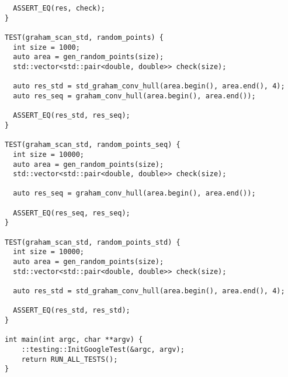\documentclass{report}
\begin{document}
\begin{lstlisting}
  ASSERT_EQ(res, check);
}

TEST(graham_scan_std, random_points) {
  int size = 1000;
  auto area = gen_random_points(size);
  std::vector<std::pair<double, double>> check(size);

  auto res_std = std_graham_conv_hull(area.begin(), area.end(), 4);
  auto res_seq = graham_conv_hull(area.begin(), area.end());

  ASSERT_EQ(res_std, res_seq);
}

TEST(graham_scan_std, random_points_seq) {
  int size = 10000;
  auto area = gen_random_points(size);
  std::vector<std::pair<double, double>> check(size);

  auto res_seq = graham_conv_hull(area.begin(), area.end());

  ASSERT_EQ(res_seq, res_seq);
}

TEST(graham_scan_std, random_points_std) {
  int size = 10000;
  auto area = gen_random_points(size);
  std::vector<std::pair<double, double>> check(size);

  auto res_std = std_graham_conv_hull(area.begin(), area.end(), 4);

  ASSERT_EQ(res_std, res_std);
}

int main(int argc, char **argv) {
    ::testing::InitGoogleTest(&argc, argv);
    return RUN_ALL_TESTS();
}

\end{lstlisting}
\end{document}
